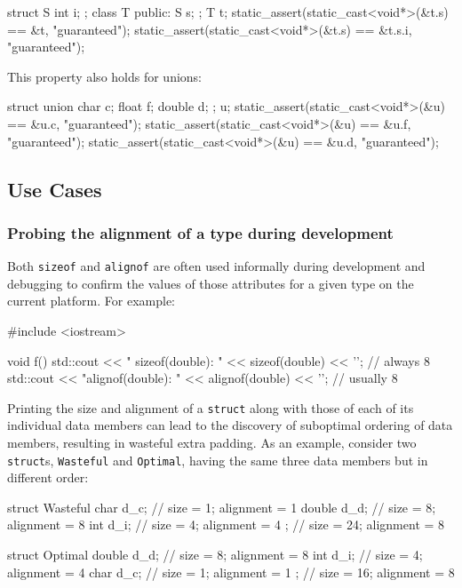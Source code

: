   \begin{emcppslisting}
struct S { int i; };
class T { public: S s; };
T t;
static_assert(static_cast<void*>(&t.s) == &t, "guaranteed");
static_assert(static_cast<void*>(&t.s) == &t.s.i, "guaranteed");
\end{emcppslisting}

\noindent This property also holds for unions:

  \begin{emcppslisting}
struct { union { char c; float f; double d; }; } u;
static_assert(static_cast<void*>(&u) == &u.c, "guaranteed");
static_assert(static_cast<void*>(&u) == &u.f, "guaranteed");
static_assert(static_cast<void*>(&u) == &u.d, "guaranteed");
\end{emcppslisting}


\subsection[Use Cases]{Use Cases}\label{use-cases}

\subsubsection[Probing the alignment of a type during development]{Probing the alignment of a type during development}\label{probing-the-alignment-of-a-type-during-development}

Both \lstinline!sizeof! and \lstinline!alignof! are often used informally
during development and debugging to confirm the values
of those attributes for a given type on the current platform. For
example:

\begin{emcppslisting}
#include <iostream>

void f()
{
    std::cout << " sizeof(double): " <<  sizeof(double) << '\n';  //  always 8
    std::cout << "alignof(double): " << alignof(double) << '\n';  // usually 8
}
\end{emcppslisting}

\noindent Printing the size and alignment of a \lstinline!struct! along with those of
each of its individual data members can lead to the discovery of
suboptimal ordering of data members, resulting in wasteful extra
padding. As an example, consider two \lstinline!struct!s,
\lstinline!Wasteful! and \lstinline!Optimal!, having the same three data members but
in different order:

\begin{emcppslisting}
struct Wasteful
{
    char   d_c;  // size =  1;  alignment = 1
    double d_d;  // size =  8;  alignment = 8
    int    d_i;  // size =  4;  alignment = 4
};               // size = 24;  alignment = 8

struct Optimal
{
    double d_d;  // size =  8;  alignment = 8
    int    d_i;  // size =  4;  alignment = 4
    char   d_c;  // size =  1;  alignment = 1
};               // size = 16;  alignment = 8
\end{emcppslisting}

